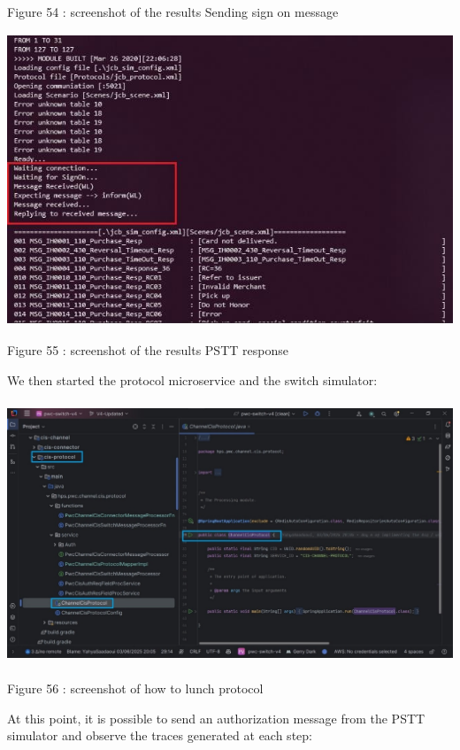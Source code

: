 \documentclass[12pt,a4paper]{report}
\begin{document}
\protect\hypertarget{_Toc201954530}{}{}Figure 54 : screenshot of the
results Sending sign on message

\includegraphics[width=5.33251in,height=3.4402in]{vertopal_d1b0b2209edd4c6aa8254f57daa0953b/media/image74.jpeg}

\protect\hypertarget{_Toc201954531}{}{}Figure 55 : screenshot of the
results PSTT response

We then started the protocol microservice and the switch simulator:

\includegraphics[width=5.49361in,height=3.08092in]{vertopal_d1b0b2209edd4c6aa8254f57daa0953b/media/image75.jpeg}

\protect\hypertarget{_Toc201954532}{}{}Figure 56 : screenshot of how to
lunch protocol

At this point, it is possible to send an authorization message from the
PSTT simulator and observe the traces generated at each step:
\end{document}
